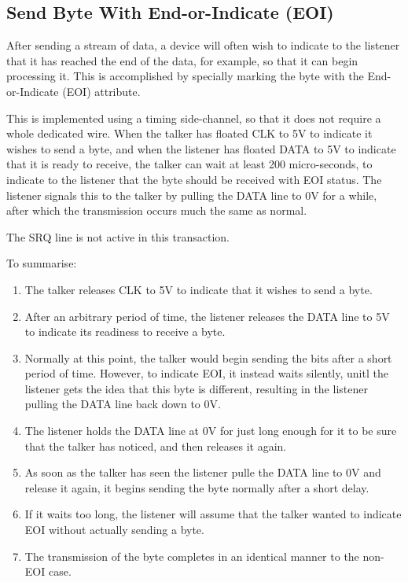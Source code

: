 \subsection{Send Byte With End-or-Indicate (EOI)}

After sending a stream of data, a device will often wish to indicate
to the listener that it has reached the end of the data, for example,
so that it can begin processing it.  This is accomplished by specially
marking the byte with the End-or-Indicate (EOI) attribute.

This is
implemented using a timing side-channel, so that it does not require a
whole dedicated wire. When the talker has floated CLK to 5V to indicate it
wishes to send a byte, and when the listener has floated DATA to 5V to
indicate that it is ready to receive, the talker can wait at least 200
micro-seconds, to indicate to the listener that the byte should be
received with EOI status.  The listener signals this to the talker by
pulling the DATA line to 0V for a while, after which the transmission
occurs much the same as normal.

The SRQ line is not active in this transaction.

To summarise:

\begin{enumerate}
\item The talker releases CLK to 5V to indicate that it wishes to
  send a byte.
\item After an arbitrary period of time, the listener releases the
  DATA line to 5V to indicate its readiness to receive a byte.
\item Normally at this point, the talker would begin sending the bits
  after a short period of time.  However, to indicate EOI, it instead
  waits silently, unitl the listener gets the idea that this byte is
  different, resulting in the listener pulling the DATA line back down
  to 0V.
\item The listener holds the DATA line at 0V for just long enough
  for it to be sure that the talker has noticed, and then releases
  it again.
\item As soon as the talker has seen the listener pulle the DATA
  line to 0V and release it again, it begins sending the byte
  normally after a short delay.
\item If it waits too long, the listener will assume that the talker
  wanted to indicate EOI without actually sending a byte.
  \item The transmission of the byte completes in an identical manner
    to the non-EOI case.
\end{enumerate}


